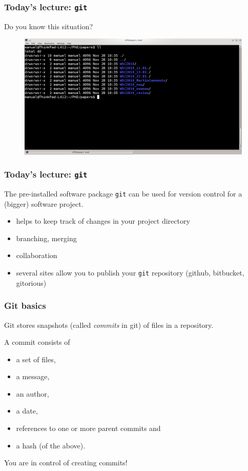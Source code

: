 \documentclass{beamer}
\begin{document}
\begin{frame}
\frametitle{Today's lecture: \texttt{git}}
Do you know this situation?
\begin{figure}
\centering
 \includegraphics[height=0.6\textheight]{images/screnshot1.png}
\end{figure}
\end{frame}

\begin{frame}
\frametitle{Today's lecture: \texttt{git}}
The pre-installed software package \texttt{git} can be used for version control for a (bigger) software project.
\begin{itemize}
 \item helps to keep track of changes in your project directory
 \item branching, merging
 \item collaboration
 \item several sites allow you to publish your \texttt{git} repository (github, bitbucket, gitorious) 
\end{itemize}
\end{frame}

\begin{frame}
\frametitle{Git basics}
Git stores snapshots (called \emph{commits} in git) of files in a repository.

A commit consists of
\begin{itemize}
 \item a set of files,
 \item a message,
 \item an author,
 \item a date,
 \item references to one or more parent commits and
 \item a hash (of the above).
\end{itemize}

You are in control of creating commits!
\end{frame}
\end{document}
